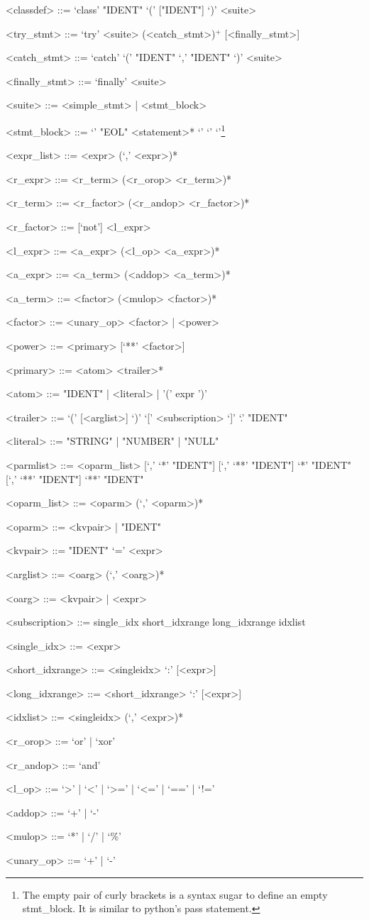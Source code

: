 \documentclass[10pt,a4paper]{article}
\begin{document}
\begin{grammar}
<classdef> ::= `class' "IDENT" `(' ["IDENT"] `)' <suite>

<try_stmt> ::= `try' <suite> (<catch_stmt>)$^{+}$ [<finally_stmt>]

<catch_stmt> ::= `catch' `(' "IDENT" `,' "IDENT" `)' <suite>

<finally_stmt> ::= `finally' <suite>

<suite> ::= <simple_stmt> | <stmt_block>

<stmt_block> ::= `{' "EOL" <statement>* `}'
	\alt `{' `}'\footnote{The empty pair of curly brackets is a syntax sugar
to define an empty stmt_block. It is similar to python's pass statement.}


<expr_list> ::= <expr> (`,' <expr>)*

<r_expr> ::= <r_term> (<r_orop> <r_term>)*

<r_term> ::= <r_factor> (<r_andop> <r_factor>)*

<r_factor> ::= [`not'] <l_expr>

<l_expr> ::= <a_expr> (<l_op> <a_expr>)*

<a_expr> ::= <a_term> (<addop> <a_term>)*

<a_term> ::= <factor> (<mulop> <factor>)*

<factor> ::= <unary_op> <factor> | <power>

<power> ::= <primary> [`**' <factor>]

<primary> ::= <atom> <trailer>*

<atom> ::= "IDENT" | <literal> | '(' expr ')'

<trailer> ::= `(' [<arglist>] `)' 
	\alt `[' <subscription> `]'
	\alt `.' "IDENT"

<literal> ::= "STRING" | "NUMBER" | "NULL"


<parmlist> ::= <oparm_list> [`,' `*' "IDENT"] [`,' `**' "IDENT"]
    \alt `*' "IDENT" [`,' `**' "IDENT"]
    \alt `**' "IDENT"

<oparm_list> ::= <oparm> (`,' <oparm>)*

<oparm> ::= <kvpair> | "IDENT"

<kvpair> ::= "IDENT" `=' <expr>

<arglist> ::= <oarg> (`,' <oarg>)*

<oarg> ::= <kvpair> | <expr>

<subscription> ::= single_idx 
	\alt short_idxrange 
	\alt long_idxrange 
	\alt idxlist

<single_idx> ::= <expr>

<short_idxrange> ::= <singleidx> `:' [<expr>] 

<long_idxrange> ::= <short_idxrange> `:' [<expr>]

<idxlist> ::= <singleidx> (`,' <expr>)*

<r_orop> ::= `or' | `xor'

<r_andop> ::= `and'

<l_op> ::= `>' | `<' | `>=' | `<=' | `==' | `!='

<addop> ::= `+' | `-'

<mulop> ::= `*' | `/' | `\%'

<unary_op> ::= `+' | `-'

\end{grammar}
\end{document}
